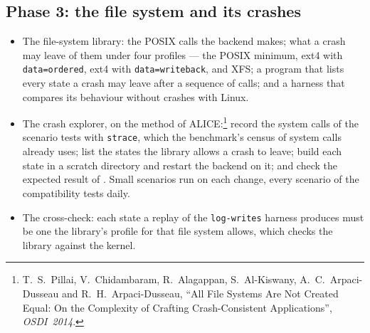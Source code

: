 \subsection*{Phase 3: the file system and its crashes}
\begin{itemize}
  \item The file-system library: the POSIX calls the backend makes; what a
    crash may leave of them under four profiles --- the POSIX minimum, ext4
    with \texttt{data=ordered}, ext4 with \texttt{data=writeback}, and XFS;
    a program that lists every state a crash may leave after a sequence of
    calls; and a harness that compares its behaviour without crashes with
    Linux.
  \item The crash explorer, on the method of
    ALICE:\footnote{T.~S.~Pillai, V.~Chidambaram, R.~Alagappan, S.~Al-Kiswany,
    A.~C.~Arpaci-Dusseau and R.~H.~Arpaci-Dusseau, ``All File Systems Are Not
    Created Equal: On the Complexity of Crafting Crash-Consistent
    Applications'', \emph{OSDI~2014}.} record the system calls of the
    scenario tests with \texttt{strace}, which the benchmark's census of
    system calls already uses; list the states the library allows a crash to
    leave;
    build each state in a scratch directory and restart the backend on it;
    and check the expected result of .
    Small scenarios run on each change, every scenario of the compatibility
    tests daily.
  \item The cross-check: each state a replay of the \texttt{log-writes}
    harness produces must be one the library's profile for that file system
    allows, which checks the library against the kernel.
\end{itemize}

